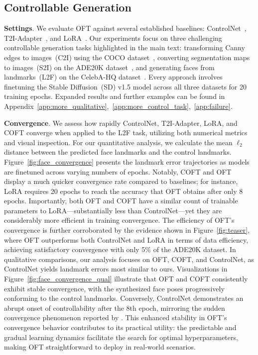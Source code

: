 {\subsection{Controllable Generation}

\textbf{Settings}. We evaluate OFT against several established baselines: ControlNet~\cite{zhang2023adding}, T2I-Adapter~\cite{mou2023t2i}, and LoRA~\cite{hulora2022}. Our experiments focus on three challenging controllable generation tasks highlighted in the main text: transforming Canny edges to images~(C2I) using the COCO dataset~\cite{lin2014microsoft}, converting segmentation maps to images~(S2I) on the ADE20K dataset~\cite{zhou2017scene}, and generating faces from landmarks~(L2F) on the CelebA-HQ dataset~\cite{karras2018progressive,xia2021tedigan}. Every approach involves finetuning the Stable Diffusion~(SD) v1.5 model across all three datasets for 20 training epochs. Expanded results and further examples can be found in Appendix~\ref{app:more_qualitative},~\ref{app:more_control_task},~\ref{app:failure}.

\textbf{Convergence}. We assess how rapidly ControlNet, T2I-Adapter, LoRA, and COFT converge when applied to the L2F task, utilizing both numerical metrics and visual inspection. For our quantitative analysis, we calculate the mean $\ell_2$ distance between the predicted face landmarks and the control landmarks. Figure~\ref{fig:face_convergence} presents the landmark error trajectories as models are finetuned across varying numbers of epochs. Notably, COFT and OFT display a much quicker convergence rate compared to baselines; for instance, LoRA requires 20 epochs to reach the accuracy that OFT obtains after only 8 epochs. Importantly, both OFT and COFT have a similar count of trainable parameters to LoRA—substantially less than ControlNet—yet they are considerably more efficient in training convergence. The efficiency of OFT’s convergence is further corroborated by the evidence shown in Figure~\ref{fig:teaser}, where OFT outperforms both ControlNet and LoRA in terms of data efficiency, achieving satisfactory convergence with only 5\% of the ADE20K dataset. In qualitative comparisons, our analysis focuses on OFT, COFT, and ControlNet, as ControlNet yields landmark errors most similar to ours. Visualizations in Figure~\ref{fig:face_convergence_qual} illustrate that OFT and COFT consistently exhibit stable convergence, with the synthesized face poses progressively conforming to the control landmarks. Conversely, ControlNet demonstrates an abrupt onset of controllability after the 8th epoch, mirroring the sudden convergence phenomenon reported by \cite{zhang2023adding}. This enhanced stability in OFT’s convergence behavior contributes to its practical utility: the predictable and gradual learning dynamics facilitate the search for optimal hyperparameters, making OFT straightforward to deploy in real-world scenarios.

}
